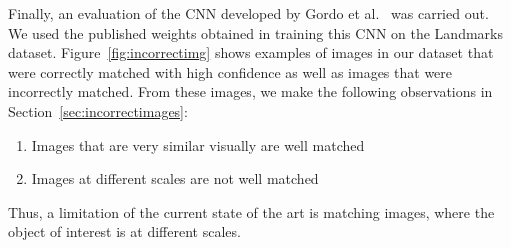Finally, an evaluation of the CNN developed by
Gordo et al.~\cite{gordo_deep_2016} was carried out.
We used the published weights obtained in training this CNN on the
Landmarks dataset.
Figure~\ref{fig:incorrectimg}
shows examples of images in our dataset that were correctly matched
with high confidence as well as images that were incorrectly matched.
From these images, we make the following observations in
Section~\ref{sec:incorrectimages}:

\begin{enumerate}
    \item Images that are very similar visually are well matched
    \item Images at different scales are not well matched
\end{enumerate}

Thus, a limitation of the current state of the art is matching
images, where the object of interest is at different scales.
